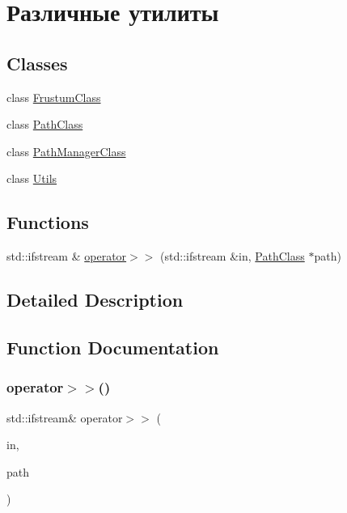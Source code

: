 \hypertarget{group___utils}{}\section{Различные утилиты}
\label{group___utils}
\subsection*{Classes}
\begin{DoxyCompactItemize}
\item 
class \hyperlink{class_frustum_class}{Frustum\+Class}
\item 
class \hyperlink{class_path_class}{Path\+Class}
\item 
class \hyperlink{class_path_manager_class}{Path\+Manager\+Class}
\item 
class \hyperlink{class_utils}{Utils}
\end{DoxyCompactItemize}
\subsection*{Functions}
\begin{DoxyCompactItemize}
\item 
std\+::ifstream \& \hyperlink{group___utils_ga7cad407915b4628903e4d0358bc12b0d}{operator$>$$>$} (std\+::ifstream \&in, \hyperlink{class_path_class}{Path\+Class} $\ast$path)
\end{DoxyCompactItemize}


\subsection{Detailed Description}


\subsection{Function Documentation}
\mbox{\label{group___utils_ga7cad407915b4628903e4d0358bc12b0d}} 
\subsubsection{\texorpdfstring{operator$>$$>$()}{operator>>()}}
{\footnotesize\ttfamily std\+::ifstream\& operator$>$$>$ (\begin{DoxyParamCaption}\item[{std\+::ifstream \&}]{in,  }\item[{\hyperlink{class_path_class}{Path\+Class} $\ast$}]{path }\end{DoxyParamCaption})}

